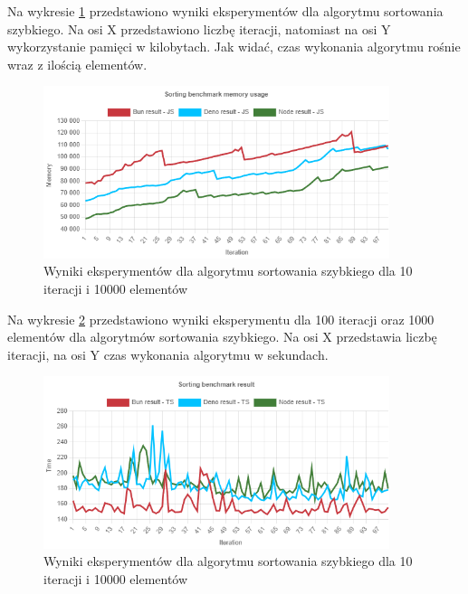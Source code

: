 Na wykresie \ref{fig:quick_sorting_e4_memory_js} przedstawiono wyniki eksperymentów dla algorytmu sortowania szybkiego. Na osi X przedstawiono liczbę iteracji, natomiast na osi Y wykorzystanie pamięci w kilobytach. Jak widać, czas wykonania algorytmu rośnie wraz z ilością elementów.
\begin{figure}[H]
  \centering
  \includegraphics[width=0.9\textwidth]{Figures/sorting/quick/e4_memory_js.png}
  \caption{Wyniki eksperymentów dla algorytmu sortowania szybkiego dla 10 iteracji i 10000 elementów}
  \label{fig:quick_sorting_e4_memory_js}
\end{figure}

Na wykresie \ref{fig:quick_sorting_e4_ts} przedstawiono wyniki eksperymentu dla 100 iteracji oraz 1000 elementów dla algorytmów sortowania szybkiego. Na osi X przedstawia liczbę iteracji, na osi Y czas wykonania algorytmu w sekundach. 

\begin{figure}[H]
  \centering
  \includegraphics[width=0.9\textwidth]{Figures/sorting/quick/e4_ts.png}
  \caption{Wyniki eksperymentów dla algorytmu sortowania szybkiego dla 10 iteracji i 10000 elementów}
  \label{fig:quick_sorting_e4_ts}
\end{figure}

